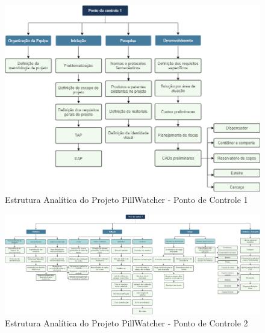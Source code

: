 \begin{apendicesenv}
\begin{figure}[H]
    \centering
    \includegraphics[width=\textwidth]{figuras/gerenciamento/eap_pc1.png}
    \caption{Estrutura Analítica do Projeto PillWatcher - Ponto de Controle 1 }
    \label{fig:eap_pc1}
\end{figure}

\begin{landscape}
\begin{figure}[H]
    \centering
    \vspace{1cm}
    \hspace{-1cm}
    \includegraphics[scale=0.3]{figuras/gerenciamento/eap_pc2.png}
    \caption{Estrutura Analítica do Projeto PillWatcher - Ponto de Controle 2 }
    \vspace{-5pt}
    \label{fig:eap_pc2}
\end{figure}
\end{landscape}


\end{apendicesenv}

